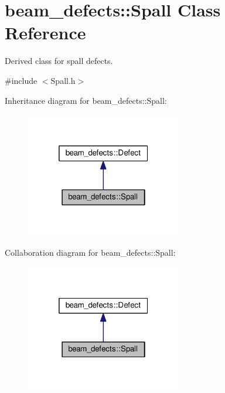 \hypertarget{classbeam__defects_1_1_spall}{}\section{beam\+\_\+defects\+:\+:Spall Class Reference}
\label{classbeam__defects_1_1_spall}


Derived class for spall defects.  




{\ttfamily \#include $<$Spall.\+h$>$}



Inheritance diagram for beam\+\_\+defects\+:\+:Spall\+:\nopagebreak
\begin{figure}[H]
\begin{center}
\leavevmode
\includegraphics[width=193pt]{classbeam__defects_1_1_spall__inherit__graph}
\end{center}
\end{figure}


Collaboration diagram for beam\+\_\+defects\+:\+:Spall\+:\nopagebreak
\begin{figure}[H]
\begin{center}
\leavevmode
\includegraphics[width=193pt]{classbeam__defects_1_1_spall__coll__graph}
\end{center}
\end{figure}

